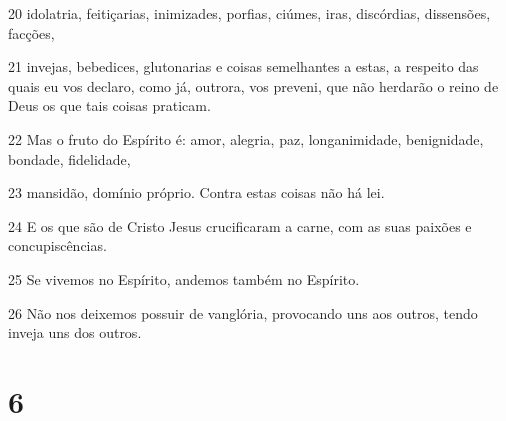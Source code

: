 \par 20 idolatria, feitiçarias, inimizades, porfias, ciúmes, iras, discórdias, dissensões, facções,
\par 21 invejas, bebedices, glutonarias e coisas semelhantes a estas, a respeito das quais eu vos declaro, como já, outrora, vos preveni, que não herdarão o reino de Deus os que tais coisas praticam.
\par 22 Mas o fruto do Espírito é: amor, alegria, paz, longanimidade, benignidade, bondade, fidelidade,
\par 23 mansidão, domínio próprio. Contra estas coisas não há lei.
\par 24 E os que são de Cristo Jesus crucificaram a carne, com as suas paixões e concupiscências.
\par 25 Se vivemos no Espírito, andemos também no Espírito.
\par 26 Não nos deixemos possuir de vanglória, provocando uns aos outros, tendo inveja uns dos outros.

\chapter{6}

